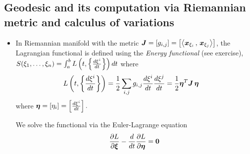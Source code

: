 \documentclass[11pt]{article}
\begin{document}
\subsection{Geodesic and its computation via Riemannian metric and calculus of variations}
\begin{itemize}
\item  In Riemannian manifold with the metric $\boldsymbol{J} = [g_{i,j}]= \left[\left\langle \boldsymbol{x}_{\xi_{i}}\,,\, \boldsymbol{x}_{\xi_{j}} \right\rangle\right]$, the Lagrangian functional is defined using the \emph{Energy functional} (see exercise), $S(\xi_{1},\ldots, \xi_{n}) = \int_{a}^{b}L\left(t, \left\{\frac{d\xi^{i}}{dt}\right\}\right) dt$ where
\begin{align*}
L\left(t, \left\{\frac{d\xi^{i}}{dt}\right\}\right) &= \frac{1}{2}\sum_{i,j}g_{i,j}\frac{d\xi^{i}}{dt}\frac{d\xi^{j}}{dt} = \frac{1}{2}\boldsymbol{\eta}^{T}\boldsymbol{J}\,\boldsymbol{\eta}
\end{align*}  where $\boldsymbol{\eta} = [\eta_{i}] = \left[\frac{d\xi^{i}}{dt}\right].$

We solve the functional via the Euler-Lagrange equation
\begin{align*}
\frac{\partial L}{ \partial \boldsymbol{\xi}} - \frac{d}{dt}\frac{\partial L}{ \partial \boldsymbol{\eta}}  = \boldsymbol{0}
\end{align*}


\end{itemize}
\end{document}
